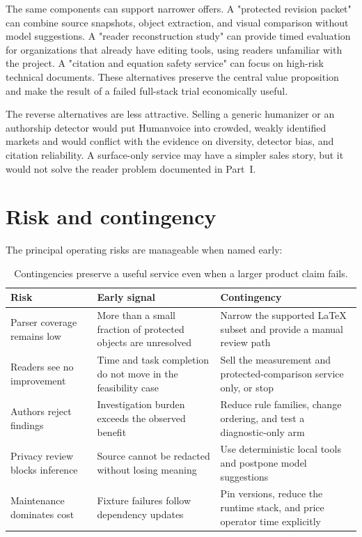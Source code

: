 The same components can support narrower offers. A "protected revision packet"
can combine source snapshots, object extraction, and visual comparison without
model suggestions. A "reader reconstruction study" can provide timed
evaluation for organizations that already have editing tools, using readers
unfamiliar with the project. A
"citation and equation safety service" can focus on high-risk technical
documents. These alternatives preserve the central value proposition and make
the result of a failed full-stack trial economically useful.

The reverse alternatives are less attractive. Selling a generic humanizer or
an authorship detector would put Humanvoice into crowded, weakly identified
markets and would conflict with the evidence on diversity, detector bias, and
citation reliability. A surface-only service may have a simpler sales story,
but it would not solve the reader problem documented in Part~I.

\section{Risk and contingency}
\label{sec:ops-contingency}

The principal operating risks are manageable when named early:

\begin{table}[H]
\centering
\small
\begin{tabularx}{\textwidth}{@{}p{}L p{0.29\textwidth}@{}}
\toprule
Risk & Early signal & Contingency \\
\midrule
Parser coverage remains low & More than a small fraction of protected objects
are unresolved & Narrow the supported LaTeX subset and provide a manual review
path \\
Readers see no improvement & Time and task completion do not move in the
feasibility case & Sell the measurement and protected-comparison service only,
or stop \\
Authors reject findings & Investigation burden exceeds the observed benefit &
Reduce rule families, change ordering, and test a diagnostic-only arm \\
Privacy review blocks inference & Source cannot be redacted without losing
meaning & Use deterministic local tools and postpone model suggestions \\
Maintenance dominates cost & Fixture failures follow dependency updates & Pin
versions, reduce the runtime stack, and price operator time explicitly \\
\bottomrule
\end{tabularx}
\caption{Contingencies preserve a useful service even when a larger product
claim fails.}
\label{tab:ops-risks}
\end{table}

